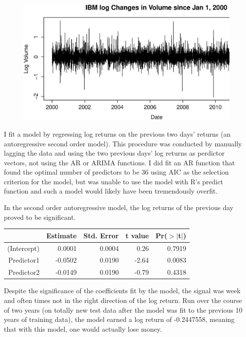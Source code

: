 \documentclass{article}
\begin{document}
\begin{figure}[H]
\begin{center}
\includegraphics[width=1\columnwidth]{IBM_log_volume.eps}
\caption{}
\end{center}
\end{figure}


I fit a model by regressing log returns on the previous two days' returns (an autoregressive second order model).  This procedure was conducted by manually lagging the data and using the two previous days' log returns as perdictor vectors, not using the AR or ARIMA functions. I did fit an AR function that found the optimal number of predictors to be 36 using AIC as the selection criterion for the model, but was unable to use the model with R's predict function and such a model would likely have been tremendously overfit. 

In the second order autoregressive model, the log returns of the previous day proved to be significant.
\begin{table}[ht]
\begin{center}
\begin{tabular}{rrrrr}
  \hline
 & Estimate & Std. Error & t value & Pr($>$$|$t$|$) \\ 
  \hline
(Intercept) & 0.0001 & 0.0004 & 0.26 & 0.7919 \\ 
  Predictor1 & -0.0502 & 0.0190 & -2.64 & 0.0083 \\ 
  Predictor2 & -0.0149 & 0.0190 & -0.79 & 0.4318 \\ 
   \hline
\end{tabular}
\end{center}
\end{table} 
Despite the significance of the coefficients fit by the model, the signal was week and often times not in the right direction of the log return.  Run over the course of two years (on totally new test data after the model was fit to the previous 10 years of training data), the model earned a log return of -0.2447558, meaning that with this model, one would actually lose money.
\end{document}
